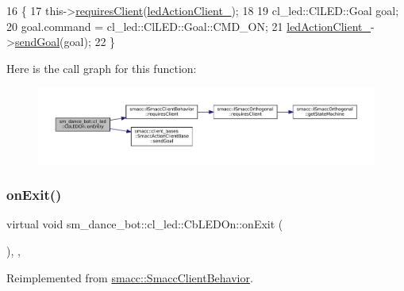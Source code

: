 \begin{DoxyCode}
16   \{
17     this->\hyperlink{classsmacc_1_1ISmaccClientBehavior_a32b16e99e3b4cb289414203dc861a440}{requiresClient}(\hyperlink{classsm__dance__bot_1_1cl__led_1_1CbLEDOn_a1ee516ed1a051922f804818ea429f2fe}{ledActionClient\_});
18 
19     cl\_led::ClLED::Goal goal;
20     goal.command = cl\_led::ClLED::Goal::CMD\_ON;
21     \hyperlink{classsm__dance__bot_1_1cl__led_1_1CbLEDOn_a1ee516ed1a051922f804818ea429f2fe}{ledActionClient\_}->\hyperlink{classsmacc_1_1client__bases_1_1SmaccActionClientBase_a9c47a5094ac8afb01680307fe5eca922}{sendGoal}(goal);
22   \}
\end{DoxyCode}
Here is the call graph for this function\+:
\nopagebreak
\begin{figure}[H]
\begin{center}
\leavevmode
\includegraphics[width=350pt]{classsm__dance__bot_1_1cl__led_1_1CbLEDOn_a3b7de8585d728becefb8c2c5cc3b6d95_cgraph}
\end{center}
\end{figure}
\mbox{\label{classsm__dance__bot_1_1cl__led_1_1CbLEDOn_a60a82058c585b4d0398b531c1e1bdf0b}} 
\subsubsection{\texorpdfstring{on\+Exit()}{onExit()}}
{\footnotesize\ttfamily virtual void sm\+\_\+dance\+\_\+bot\+::cl\+\_\+led\+::\+Cb\+L\+E\+D\+On\+::on\+Exit (\begin{DoxyParamCaption}{ }\end{DoxyParamCaption})\hspace{0.3cm}{\ttfamily [inline]}, {\ttfamily [override]}, {\ttfamily [virtual]}}



Reimplemented from \hyperlink{classsmacc_1_1SmaccClientBehavior_a7e4fb6ce81ff96dc172425852d69c0c5}{smacc\+::\+Smacc\+Client\+Behavior}.



